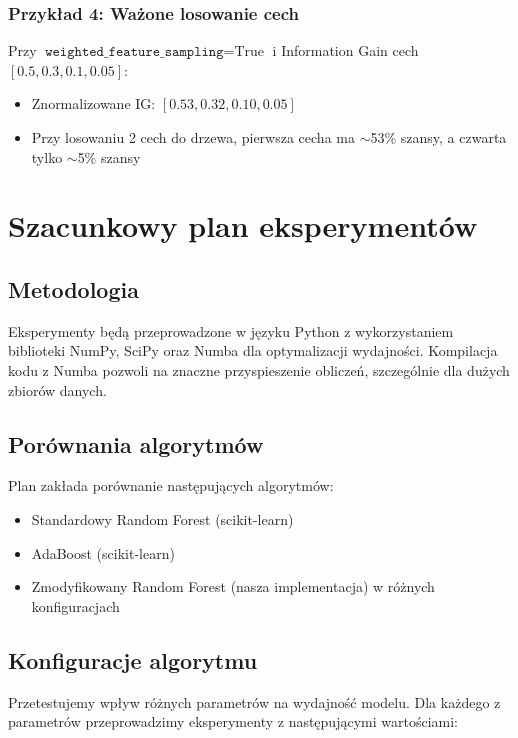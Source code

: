 \documentclass[12pt,a4paper]{article}
\begin{document}
\subsubsection{Przykład 4: Ważone losowanie cech}
Przy $\texttt{weighted\_feature\_sampling} = \text{True}$ i Information Gain cech $[0.5, 0.3, 0.1, 0.05]$:
\begin{itemize}
    \item Znormalizowane IG: $[0.53, 0.32, 0.10, 0.05]$
    \item Przy losowaniu 2 cech do drzewa, pierwsza cecha ma $\sim$53\% szansy, a czwarta tylko $\sim$5\% szansy
\end{itemize}

\section{Szacunkowy plan eksperymentów}

\subsection{Metodologia}

Eksperymenty będą przeprowadzone w języku Python z wykorzystaniem biblioteki NumPy, SciPy oraz Numba dla optymalizacji wydajności. Kompilacja kodu z Numba pozwoli na znaczne przyspieszenie obliczeń, szczególnie dla dużych zbiorów danych.

\subsection{Porównania algorytmów}

Plan zakłada porównanie następujących algorytmów:
\begin{itemize}
    \item Standardowy Random Forest (scikit-learn)
    \item AdaBoost (scikit-learn)
    \item Zmodyfikowany Random Forest (nasza implementacja) w różnych konfiguracjach
\end{itemize}

\subsection{Konfiguracje algorytmu}

Przetestujemy wpływ różnych parametrów na wydajność modelu. Dla każdego z parametrów przeprowadzimy eksperymenty z następującymi wartościami:
\end{document}
